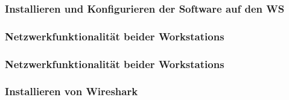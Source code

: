 \subsubsection{Installieren und Konfigurieren der Software auf den WS}

\subsubsection{Netzwerkfunktionalität beider Workstations}

\subsubsection{Netzwerkfunktionalität beider Workstations}

\subsubsection{Installieren von Wireshark}